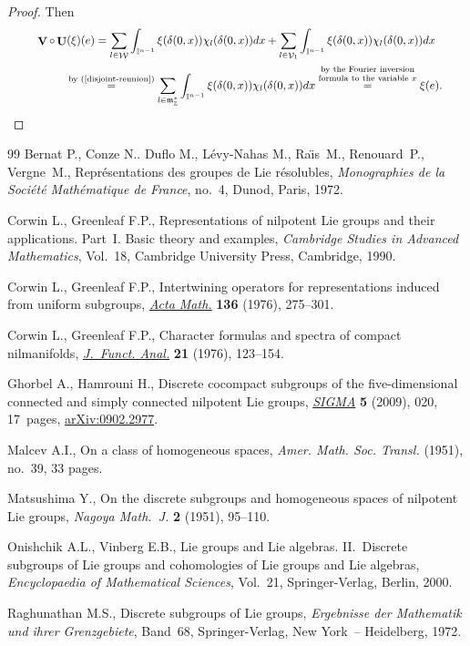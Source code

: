 \documentclass[11pt]{article}
\DeclareMathOperator{\U}{\mathbf{U}}
\DeclareMathOperator{\V}{\mathbf{V}} \DeclareMathOperator{\Aut}{Aut}
\DeclareMathOperator{\nongen}{\mathcal{V}}
\DeclareMathOperator{\gen}{\mathcal{W}}
\def\tore{{\mathbb I}}
\begin{document}
\begin{proof}
Then
\begin{gather*}
\V\circ \U(\xi)(e)  =  \sum_{l\in \gen} \int_{\tore^{n-1}}
\xi(\delta(0, x)) \chi_l( \delta(0, x)) dx  + \sum_{l\in \nongen_1}
\int_{\tore^{n-1}}
    \xi(\delta(0, x)) \chi_{l}(\delta(0, x))  dx\\
\hphantom{\V\circ \U(\xi)(e)}{}
 \overset{\text{by (\ref{disjoint-reunion})}}{=}
   \sum_{l\in \frak m_{\mathbb{Z}}^*} \int_{\tore^{n-1}}
\xi(\delta(0, x))
\chi_l( \delta(0, x)) dx
\overset{\mbox{\scriptsize $\begin{array}{@{}c@{}}\text{by the Fourier inversion} \\ \text{formula to the variable  $x$}\end{array}$}}{=} \xi(e). \tag*{\qed}
\end{gather*}\renewcommand{\qed}{}
\end{proof}
\begin{thebibliography}{99}
Bernat P., Conze N.. Duflo M., L\'evy-Nahas M., Ra\"{\i}s~M., Renouard~P., Vergne~M.,
Repr\'esentations des groupes de Lie r\'esolubles,
{\it Monographies de la Soci\'et\'e Math\'ematique de France}, no.~4, Dunod, Paris, 1972.


Corwin L., Greenleaf F.P.,
Representations of nilpotent Lie groups and their applications. Part~I. Basic theory and examples,
{\it Cambridge Studies in Advanced Mathematics}, Vol.~18, Cambridge University Press, Cambridge, 1990.

Corwin L., Greenleaf F.P.,
Intertwining operators for representations induced from uniform subgroups,
\href{http://dx.doi.org/10.1007/BF02392047}{{\it Acta Math.}} \textbf{136} (1976), 275--301.

Corwin L., Greenleaf F.P.,
Character formulas and spectra of compact nilmanifolds,
\href{http://dx.doi.org/10.1016/0022-1236(76)90074-4}{{\it J.~Funct. Anal.}} \textbf{21} (1976), 123--154.

Ghorbel A., Hamrouni H.,
Discrete cocompact subgroups of  the f\/ive-dimensional connected and simply connected nilpotent Lie groups,
\href{http://dx.doi.org/10.3842/SIGMA.2009.020}{{\it SIGMA}} \textbf{5} (2009), 020, 17~pages,
\href{http://arxiv.org/abs/0902.2977}{arXiv:0902.2977}.


Malcev A.I.,
On a class of homogeneous spaces,
{\it Amer. Math. Soc. Transl.}   (1951), no.~39, 33 pages.

Matsushima Y.,
On the discrete subgroups and homogeneous spaces of nilpotent Lie groups,
{\it  Nagoya Math.~J.} \textbf{2} (1951), 95--110.


Onishchik A.L., Vinberg E.B.,
Lie groups and Lie algebras. II.~Discrete subgroups of Lie groups and cohomologies of Lie groups and Lie algebras,
{\it Encyclopaedia of Mathematical Sciences}, Vol.~21, Springer-Verlag, Berlin, 2000.

Raghunathan M.S.,
Discrete subgroups of Lie groups,
{\it Ergebnisse der Mathematik und ihrer Grenzgebiete}, Band~68, Springer-Verlag, New York~-- Heidelberg, 1972.

\end{thebibliography}
\end{document}
